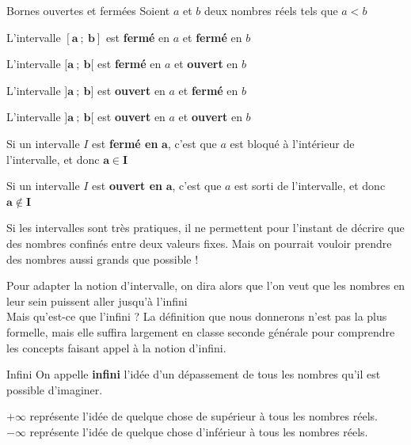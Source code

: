 \documentclass[oneside,12pt]{article}          %
\begin{document}
\begin{minipage}{0.55\linewidth} \restoreskip
    \begin{definition}{Bornes ouvertes et fermées}
    		Soient $a$ et $b$ deux nombres réels tels que $a<b$
    		
    		L'intervalle $\mathbold{ [a~;~b] }$ est \textbf{fermé} en $a$ et \textbf{fermé} en $b$ 
    		
    		L'intervalle $\mathbold{ [a~;~b[ }$ est \textbf{fermé} en $a$ et \textbf{ouvert} en $b$ 
    		
    		L'intervalle $\mathbold{ ]a~;~b] }$ est \textbf{ouvert} en $a$ et \textbf{fermé} en $b$ 
    		
    		L'intervalle $\mathbold{ ]a~;~b[ }$ est \textbf{ouvert} en $a$ et \textbf{ouvert} en $b$ 
    \end{definition}
\end{minipage}
\begin{minipage}{0.4\linewidth} \restoreskip
    \begin{astuce}
    		Si un intervalle $I$ est \textbf{fermé en} $\mathbold a$, c'est que $a$ est bloqué à l'intérieur de l'intervalle, et donc $\mathbold{a\in I}$
    		
    		Si un intervalle $I$ est \textbf{ouvert en} $\mathbold a$, c'est que $a$ est sorti de l'intervalle, et donc $\mathbold{a\notin I}$
    \end{astuce}
\end{minipage}

Si les intervalles sont très pratiques, il ne permettent pour l'instant de décrire que des nombres confinés entre deux valeurs fixes. Mais on pourrait vouloir prendre des nombres aussi grands que possible !

Pour adapter la notion d'intervalle, on dira alors que l'on veut que les nombres en leur sein puissent \og aller jusqu'à l'infini \fg \\
Mais qu'est-ce que l'infini ? La définition que nous donnerons n'est pas la plus formelle, mais elle suffira largement en classe seconde générale pour comprendre les concepts faisant appel à la notion d'infini.

\begin{definition}{Infini}
	On appelle \textbf{infini} l'idée d'un dépassement de tous les nombres qu'il est possible d'imaginer.
	
	$\mathbold{+\infty}$ représente l'idée de quelque chose de supérieur à tous les nombres réels. \\
	$\mathbold{-\infty}$ représente l'idée de quelque chose d'inférieur à tous les nombres réels.
\end{definition}
\end{document}
